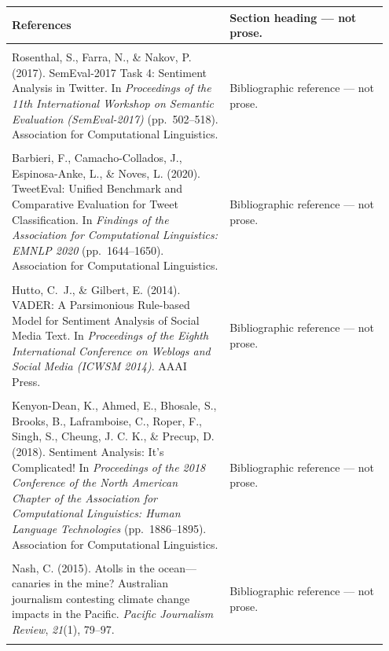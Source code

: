 \documentclass[11pt]{article}
\begin{document}
\begin{longtable}{|p{0.55\linewidth}|p{0.40\linewidth}|}
\hline
References & Section heading --- not prose. \\[2pt]
\hline
\rule{0pt}{3.5cm} & \\
\hline
Rosenthal, S., Farra, N., \& Nakov, P. (2017). SemEval-2017 Task 4: Sentiment Analysis in Twitter. In \textit{Proceedings of the 11th International Workshop on Semantic Evaluation (SemEval-2017)} (pp.\ 502--518). Association for Computational Linguistics. & Bibliographic reference --- not prose. \\[2pt]
\hline
\rule{0pt}{3.5cm} & \\
\hline
Barbieri, F., Camacho-Collados, J., Espinosa-Anke, L., \& Noves, L. (2020). TweetEval: Unified Benchmark and Comparative Evaluation for Tweet Classification. In \textit{Findings of the Association for Computational Linguistics: EMNLP 2020} (pp.\ 1644--1650). Association for Computational Linguistics. & Bibliographic reference --- not prose. \\[2pt]
\hline
\rule{0pt}{3.5cm} & \\
\hline
Hutto, C.~J., \& Gilbert, E. (2014). VADER: A Parsimonious Rule-based Model for Sentiment Analysis of Social Media Text. In \textit{Proceedings of the Eighth International Conference on Weblogs and Social Media (ICWSM 2014)}. AAAI Press. & Bibliographic reference --- not prose. \\[2pt]
\hline
\rule{0pt}{3.5cm} & \\
\hline
Kenyon-Dean, K., Ahmed, E., Bhosale, S., Brooks, B., Laframboise, C., Roper, F., Singh, S., Cheung, J. C. K., \& Precup, D. (2018). Sentiment Analysis: It's Complicated! In \textit{Proceedings of the 2018 Conference of the North American Chapter of the Association for Computational Linguistics: Human Language Technologies} (pp.\ 1886--1895). Association for Computational Linguistics. & Bibliographic reference --- not prose. \\[2pt]
\hline
\rule{0pt}{3.5cm} & \\
\hline
Nash, C. (2015). Atolls in the ocean---canaries in the mine? Australian journalism contesting climate change impacts in the Pacific. \textit{Pacific Journalism Review}, \textit{21}(1), 79--97. & Bibliographic reference --- not prose. \\[2pt]
\hline
\rule{0pt}{3.5cm} & \\
\hline
\end{longtable}
\end{document}
